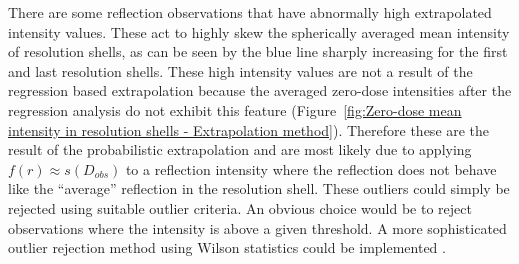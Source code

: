 There are some reflection observations that have abnormally high extrapolated intensity values.
These act to highly skew the spherically averaged mean intensity of resolution shells, as can be seen by the blue line sharply increasing for the first and last resolution shells.
These high intensity values are not a result of the regression based extrapolation because the averaged zero-dose intensities after the regression analysis do not exhibit this feature (Figure~\ref{fig:Zero-dose mean intensity in resolution shells - Extrapolation method}).
Therefore these are the result of the probabilistic extrapolation and are most likely due to applying $f(r) \approx s(D_{obs})$ to a reflection intensity where the reflection does not behave like the ``average'' reflection in the resolution shell.
These outliers could simply be rejected using suitable outlier criteria.
An obvious choice would be to reject observations where the intensity is above a given threshold.
A more sophisticated outlier rejection method using Wilson statistics could be implemented \cite{read1999detecting}.
